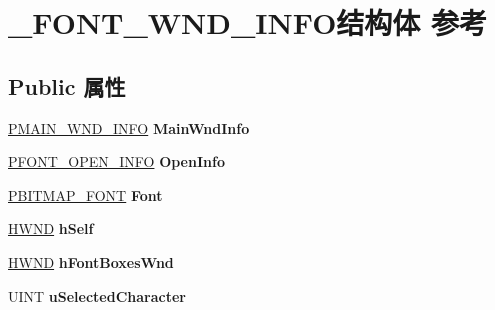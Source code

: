 \hypertarget{struct___f_o_n_t___w_n_d___i_n_f_o}{}\section{\+\_\+\+F\+O\+N\+T\+\_\+\+W\+N\+D\+\_\+\+I\+N\+F\+O结构体 参考}
\label{struct___f_o_n_t___w_n_d___i_n_f_o}
\subsection*{Public 属性}
\begin{DoxyCompactItemize}
\item 
\mbox{\label{struct___f_o_n_t___w_n_d___i_n_f_o_adb51e3b10451a0eaaf7559dfa87f2dd1}} 
\hyperlink{struct___m_a_i_n___w_n_d___i_n_f_o}{P\+M\+A\+I\+N\+\_\+\+W\+N\+D\+\_\+\+I\+N\+FO} {\bfseries Main\+Wnd\+Info}
\item 
\mbox{\label{struct___f_o_n_t___w_n_d___i_n_f_o_a42d5397ca8d2f50c31949eafe1483fc7}} 
\hyperlink{struct___f_o_n_t___o_p_e_n___i_n_f_o}{P\+F\+O\+N\+T\+\_\+\+O\+P\+E\+N\+\_\+\+I\+N\+FO} {\bfseries Open\+Info}
\item 
\mbox{\label{struct___f_o_n_t___w_n_d___i_n_f_o_a91cb5bac3b54ac8de70dcc9311f1ddd0}} 
\hyperlink{struct___b_i_t_m_a_p___f_o_n_t}{P\+B\+I\+T\+M\+A\+P\+\_\+\+F\+O\+NT} {\bfseries Font}
\item 
\mbox{\label{struct___f_o_n_t___w_n_d___i_n_f_o_ae72d4ddab5d3060270caef08b2eef997}} 
\hyperlink{interfacevoid}{H\+W\+ND} {\bfseries h\+Self}
\item 
\mbox{\label{struct___f_o_n_t___w_n_d___i_n_f_o_a3f0f1c2dc2a8be69f2ec394930e3682f}} 
\hyperlink{interfacevoid}{H\+W\+ND} {\bfseries h\+Font\+Boxes\+Wnd}
\item 
\mbox{\label{struct___f_o_n_t___w_n_d___i_n_f_o_a38546e67c74e9fb84ef9f711abe04fd0}} 
U\+I\+NT {\bfseries u\+Selected\+Character}
\item 
\mbox{\label{struct___f_o_n_t___w_n_d___i_n_f_o_a3ec915025fb3db0b12f4db9ac0249725}} 

\end{DoxyCompactItemize}
